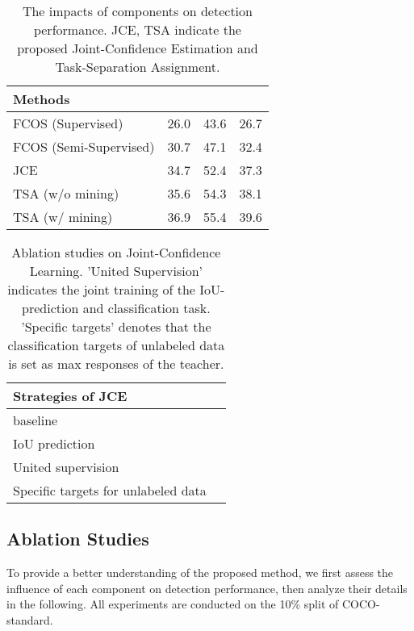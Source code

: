 \documentclass[10pt,twocolumn,letterpaper]{article}
\begin{document}
\begin{table}[t]
\setlength{\belowcaptionskip}{-10pt}
    \caption{The impacts of components on detection performance. JCE, TSA indicate the proposed Joint-Confidence Estimation and Task-Separation Assignment.}
    \centering
    \begin{tabular}{lccc}
    \hline
    Methods &  &  &  \\
    \hline
    FCOS (Supervised)      & 26.0 & 43.6 & 26.7 \\
    FCOS (Semi-Supervised) & 30.7 & 47.1 & 32.4 \\
    \hline
     JCE              & 34.7 & 52.4 & 37.3 \\
     TSA (w/o mining) & 35.6 & 54.3 & 38.1 \\
     TSA (w/ mining)  & 36.9 & 55.4 & 39.6 \\
    \hline
    \end{tabular}
    \label{table5}
\end{table}


\begin{table}[t]
\caption{Ablation studies on Joint-Confidence Learning. 'United Supervision' indicates the joint training of the IoU-prediction and classification task. 'Specific targets' denotes that the classification targets of unlabeled data is set as max responses of the teacher.}
    \centering
    \begin{tabular}{lr}
    \hline
    Strategies of JCE &  \\
    \hline
    baseline &  \\
     IoU prediction &  \\
     United supervision &  \\
     Specific targets for unlabeled data &  \\
    \hline
    \end{tabular}
    \label{table6}
\end{table}





\subsection{Ablation Studies}
\label{sec4.3}

To provide a better understanding of the proposed method, we first assess the influence of each component on detection performance, then analyze their details in the following.
All experiments are conducted on the 10\% split of COCO-standard.
\end{document}
